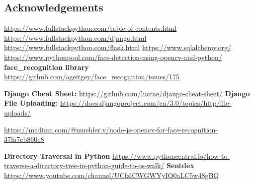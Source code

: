 \documentclass{article}
\begin{document}
\begin{flushleft}
\begin{flushleft}
\section{Acknowledgements}

\underline{\url{https://www.fullstackpython.com/table-of-contents.html}}
\newline
\underline{\url{https://www.fullstackpython.com/django.html}}
\newline
\underline{\url{https://www.fullstackpython.com/flask.html}}
\newline
\underline{\url{https://www.sqlalchemy.org/}}
\newline
\underline{\url{https://www.pythonpool.com/face-detection-using-opencv-and-python/}}
\newline
\newline
\textbf{face\_recognition library}
\underline{\url{https://github.com/ageitgey/face\_recognition/issues/175}}
\newline

\textbf{Django Cheat Sheet:}
\underline{\url{https://github.com/lucrae/django-cheat-sheet/}}
\newline
\newline
\textbf{Django File Uploading:}
\underline{\url{https://docs.djangoproject.com/en/3.0/topics/http/file-uploads/}}
\newline

\underline{\url{https://medium.com/@muehler.v/node-js-opencv-for-face-recognition-37fa7cb860e8}}
\newline

\textbf{Directory Traversal in Python}
\underline{\url{https://www.pythoncentral.io/how-to-traverse-a-directory-tree-in-python-guide-to-os-walk/}}
\newline
\newline
\textbf{Sentdex}
\newline
\underline{\url{https://www.youtube.com/channel/UCfzlCWGWYyIQ0aLC5w48gBQ}}
\end{flushleft}
\end{flushleft}
\end{document}

